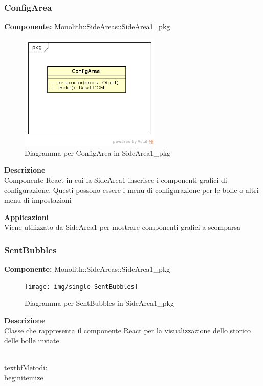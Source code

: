 \subsubsection{ConfigArea}
\textbf{Componente:}  Monolith::SideAreas::SideArea1\_pkg\\
   \FloatBarrier
   \begin{figure}[ht]
   \centering
   \includegraphics[width=0.6\textwidth]{img/single-ConfigArea}
   \caption{{Diagramma per ConfigArea in SideArea1\_pkg}}
\end{figure}
\FloatBarrier
\textbf{Descrizione}\\
Componente React in cui la SideArea1 inserisce i componenti grafici di configurazione. Questi possono essere i menu di configurazione per le bolle o altri menu di impostazioni 


\textbf{Applicazioni}\\
Viene utilizzato da SideArea1 per mostrare componenti grafici a scomparsa 


\clearpage

\subsubsection{SentBubbles}
\textbf{Componente:}  Monolith::SideAreas::SideArea1\_pkg\\
   \FloatBarrier
   \begin{figure}[ht]
   \centering
   \texttt{[image: img/single-SentBubbles]}
   \caption{{Diagramma per SentBubbles in SideArea1\_pkg}}
\end{figure}
\FloatBarrier
\textbf{Descrizione}\\
Classe che rappresenta il componente React per la visualizzazione dello storico delle bolle inviate.

\\textbf{Metodi:} 
\\begin{itemize}

